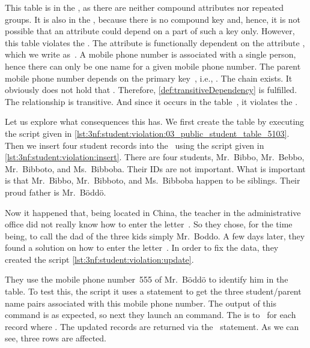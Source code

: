 This table is in the , as there are neither compound attributes nor repeated groups.
It is also in the , because there is no compound key and, hence, it is not possible that an attribute could depend on a part of such a key only.
However, this table violates the .
The attribute  is functionally dependent on the attribute , which we write as~.
A mobile phone number is associated with a single person, hence there can only be one name for a given mobile phone number.
The parent mobile phone number depends on the primary key~, i.e., .
The chain  exists.
It obviously does not hold that .
Therefore, \cref{def:transitiveDependency} is fulfilled.
The relationship  is transitive.
And since it occurs in the table~, it violates the .

Let us explore what consequences this has.
We first create the table by executing the script given in \cref{lst:3nf:student:violation:03_public_student_table_5103}.
Then we insert four student records into the \db\ using the script given in \cref{lst:3nf:student:violation:insert}.
There are four students, Mr.~Bibbo, Mr.~Bebbo, Mr.~Bibboto, and Ms.~Bibboba.
Their IDs are not important.
What is important is that Mr.~Bibbo, Mr.~Bibboto, and Ms.~Bibboba happen to be siblings.
Their proud father is Mr.~B{\"o}dd{\"o}.

Now it happened that, being located in China, the teacher in the administrative office did not really know how to enter the letter~.
So they chose, for the time being, to call the dad of the three kids simply Mr.~Boddo.
A few days later, they found a solution on how to enter the letter~.
In order to fix the data, they created the script \cref{lst:3nf:student:violation:update}.

They use the mobile phone number~555 of Mr.~B{\"o}dd{\"o} to identify him in the table.
To test this, the script it uses a  statement to get the three student/parent name pairs associated with this mobile phone number.
The output of this command is as expected, so next they launch an  command.
The  is  to~ for each record where .
The updated records are returned via the~ statement.
As we can see, three rows are affected.

